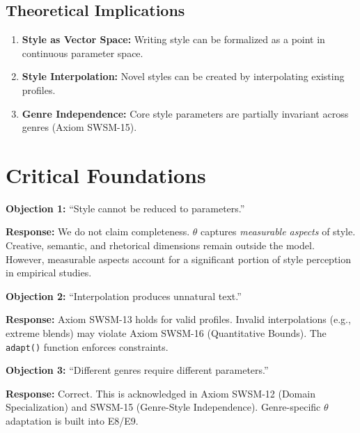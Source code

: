 \subsection{Theoretical Implications}

\begin{enumerate}
    \item \textbf{Style as Vector Space:} Writing style can be formalized as a point in continuous parameter space.
    \item \textbf{Style Interpolation:} Novel styles can be created by interpolating existing profiles.
    \item \textbf{Genre Independence:} Core style parameters are partially invariant across genres (Axiom SWSM-15).
\end{enumerate}


\section{Critical Foundations}
\label{sec:sw-foundations}

\textbf{Objection 1:} ``Style cannot be reduced to parameters.''

\textbf{Response:} We do not claim completeness. $\theta$ captures \textit{measurable aspects} of style. Creative, semantic, and rhetorical dimensions remain outside the model. However, measurable aspects account for a significant portion of style perception in empirical studies.

\textbf{Objection 2:} ``Interpolation produces unnatural text.''

\textbf{Response:} Axiom SWSM-13 holds for valid profiles. Invalid interpolations (e.g., extreme blends) may violate Axiom SWSM-16 (Quantitative Bounds). The \texttt{adapt()} function enforces constraints.

\textbf{Objection 3:} ``Different genres require different parameters.''

\textbf{Response:} Correct. This is acknowledged in Axiom SWSM-12 (Domain Specialization) and SWSM-15 (Genre-Style Independence). Genre-specific $\theta$ adaptation is built into E8/E9.


